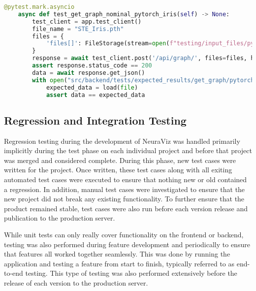 \begin{center}
    \begin{lstlisting}[language=Python, float=*htb, caption={Pytest Test Case Example}, label={lst:pytest-example}]
    @pytest.mark.asyncio
    async def test_get_graph_nominal_pytorch_iris(self) -> None:
        test_client = app.test_client()
        file_name = "STE_Iris.pth"
        files = {
            'files[]': FileStorage(stream=open(f"testing/input_files/pytorch/{file_name}", 'rb'), filename=file_name)
        }
        response = await test_client.post('/api/graph/', files=files, headers={'Content-Type': 'multipart/form-data'})
        assert response.status_code == 200
        data = await response.get_json()
        with open("src/backend/tests/expected_results/get_graph/pytorch/nominal_STE_Iris.json", 'r') as file:
            expected_data = load(file)
            assert data == expected_data
    \end{lstlisting}
\end{center}

\subsection{Regression and Integration Testing}
Regression testing during the development of NeuraViz was handled primarily implicitly during the test phase on each individual project and before that project was merged and considered complete. During this phase, new test cases were written for the project. Once written, these test cases along with all exiting automated test cases were executed to ensure that nothing new or old contained a regression. In addition, manual test cases were investigated to ensure that the new project did not break any existing functionality. To further ensure that the product remained stable, test cases were also run before each version release and publication to the production server.  

While unit tests can only really cover functionality on the frontend or backend, testing was also performed during feature development and periodically to ensure that features all worked together seamlessly. This was done by running the application and testing a feature from start to finish, typically referred to as end-to-end testing. This type of testing was also performed extensively before the release of each version to the production server.